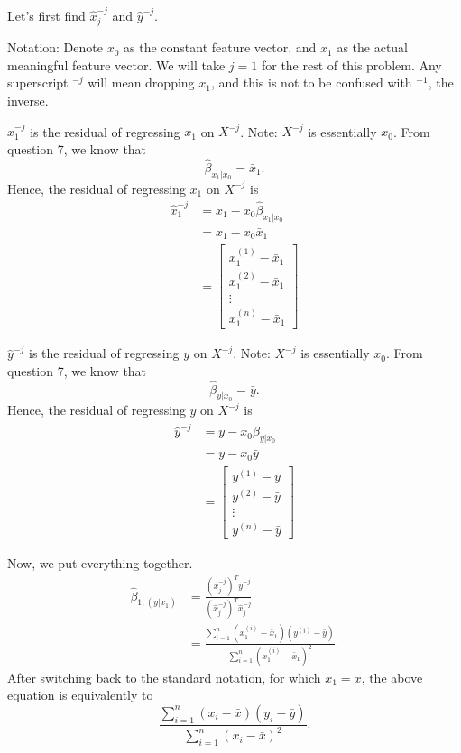 \documentclass{article}
\begin{document}
Let's first find $\hat{x}_j^{-j}$ and $\hat{y}^{-j}$.

Notation: Denote $x_0$ as the constant feature vector, and $x_1$ as the actual meaningful feature 
vector. We will take $j = 1$ for the rest of this problem. Any superscript $^{-j}$ will mean 
dropping $x_1$, and this is not to be confused with $^{-1}$, the inverse.

$\hat{x}_1^{-j}$ is the residual of regressing $x_1$ on $X^{-j}$. Note: $X^{-j}$ is essentially $x_0$.
From question 7, we know that
$$\hat{\beta}_{x_1|x_0} = \bar{x}_1.$$
Hence, the residual of regressing $x_1$ on $X^{-j}$ is
\begin{align*}
    \hat{x}_1^{-j} & = x_1 - x_0\hat{\beta}_{x_1|x_0} \\
    & = x_1 - x_0\bar{x}_1 \\
    & = \begin{bmatrix}
        x_1^{(1)} - \bar{x}_1 \\
        x_1^{(2)} - \bar{x}_1 \\
        \vdots \\
        x_1^{(n)} - \bar{x}_1 
    \end{bmatrix}
\end{align*}

$\hat{y}^{-j}$ is the residual of regressing $y$ on $X^{-j}$. Note: $X^{-j}$ is essentially $x_0$.
From question 7, we know that
$$\hat{\beta}_{y|x_0} = \bar{y}.$$
Hence, the residual of regressing $y$ on $X^{-j}$ is
\begin{align*}
    \hat{y}^{-j} & = y - x_0\hat{\beta}_{y|x_0} \\
    & = y - x_0\bar{y} \\
    & = \begin{bmatrix}
        y^{(1)} - \bar{y} \\
        y^{(2)} - \bar{y} \\
        \vdots \\
        y^{(n)} - \bar{y} 
    \end{bmatrix}
\end{align*}

Now, we put everything together.
\begin{align*}
    \hat{\beta}_{1, (y|x_1)} & = \frac{\left(\hat{x}_j^{-j}\right)^T\hat{y}^{-j}}{\left(\hat{x}_j^{-j}\right)^T\hat{x}_j^{-j}} \\
    & = \frac{\sum_{i=1}^{n}\left(x_1^{(i)}-\bar{x}_1\right)\left(y^{(i)}-\bar{y}\right)}{\sum_{i=1}^{n}\left(x_1^{(i)} - \bar{x}_1\right)^2}.
\end{align*}
After switching back to the standard notation, for which $x_1 = x$, the above equation is equivalently to 
$$\frac{\sum_{i=1}^n (x_i - \bar{x}) (y_i - \bar{y})}{\sum_{i=1}^n (x_i - \bar{x})^2}.$$
\end{document}
